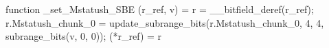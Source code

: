 function _set_Mstatush_SBE (r_ref, v) = {
    r = __bitfield_deref(r_ref);
    r.Mstatush_chunk_0 = update_subrange_bits(r.Mstatush_chunk_0, 4, 4, subrange_bits(v, 0, 0));
    (*r_ref) = r
}
